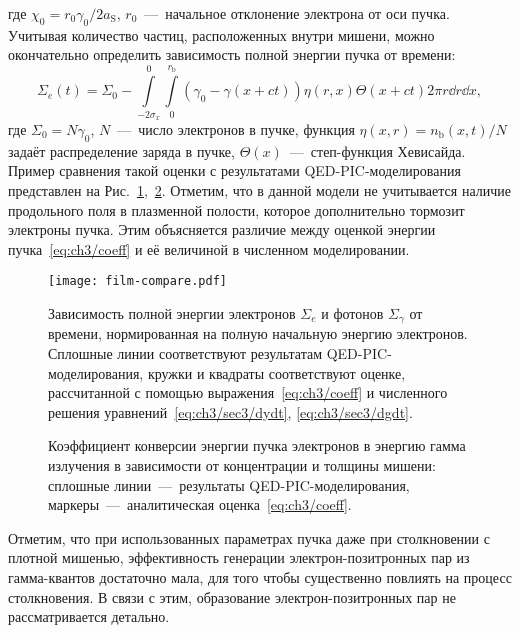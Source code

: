 где $\chi_0 = r_0 \gamma_0 / 2a_\mathrm{S}$, $r_0$~---~начальное отклонение электрона от оси пучка.
Учитывая количество частиц, расположенных внутри мишени, можно окончательно определить зависимость полной энергии пучка от времени:
\begin{equation}
    \label{eq:ch3/coeff}
    \Sigma_e(t) = \Sigma_0 - \int\limits_{-2\sigma_x}^0\int\limits_0^{r_\mathrm{b}}\left( \gamma_0 - \gamma(x + ct) \right) \eta(r, x) \Theta(x + ct) 2 \pi r \dd r \dd x ,
\end{equation}
где $\Sigma_0 = N \gamma_0$, $N$~---~число электронов в пучке, функция $\eta(x, r) = n_\mathrm{b}(x,t)/N$ задаёт распределение заряда в пучке, $\Theta(x)$~---~степ-функция Хевисайда.
Пример сравнения такой оценки с результатами QED-PIC-моделирования представлен на Рис.~\ref{fig:ch3/compare},~\ref{fig:ch3/map}.
Отметим, что в данной модели не учитывается наличие продольного поля в плазменной полости, которое дополнительно тормозит электроны пучка.
Этим объясняется различие между оценкой энергии пучка~\eqref{eq:ch3/coeff} и её величиной в численном моделировании.

\begin{figure}
    \center\texttt{[image: film-compare.pdf]}
    \caption[Зависимость полной энергии электронов и фотонов от времени при распространении сильноточного пучка в твердотельной мишени]{\label{fig:ch3/compare}
    Зависимость полной энергии электронов $\Sigma_e$ и фотонов $\Sigma_\gamma$ от времени, нормированная на полную начальную энергию электронов.
Сплошные линии соответствуют результатам QED-PIC-моделирования, кружки и квадраты соответствуют оценке, рассчитанной с помощью выражения~\eqref{eq:ch3/coeff} и численного решения уравнений~\eqref{eq:ch3/sec3/dydt}, \eqref{eq:ch3/sec3/dgdt}.}
\end{figure}

\begin{figure}
    \caption[Коэффициент конверсии энергии пучка электронов в энергию гамма излучения в зависимости от концентрации и толщины мишени]{\label{fig:ch3/map}
    Коэффициент конверсии энергии пучка электронов в энергию гамма излучения в зависимости от концентрации и толщины мишени: сплошные линии~---~результаты QED-PIC-моделирования, маркеры~---~аналитическая оценка~\eqref{eq:ch3/coeff}.}
\end{figure}

Отметим, что при использованных параметрах пучка даже при столкновении с плотной мишенью, эффективность генерации электрон-позитронных пар из гамма-квантов достаточно мала, для того чтобы существенно повлиять на процесс столкновения.
В связи с этим, образование электрон-позитронных пар не рассматривается детально.

